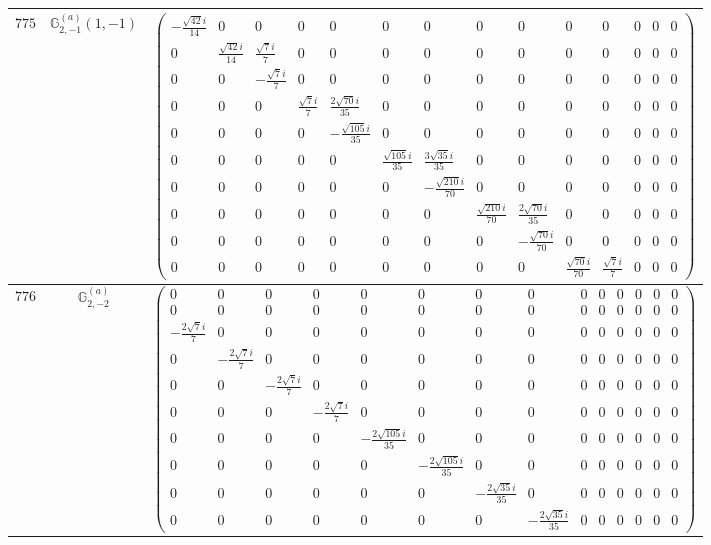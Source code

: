 \documentclass[fleqn,8pt,landscape]{jsarticle}
\begin{document}
\begin{center}
\begin{longtable}{ccc}
$ 775 $ & $ \mathbb{G}_{2,-1}^{(a)}(1,-1) $ & $ \begin{pmatrix} - \frac{\sqrt{42} i}{14} & 0 & 0 & 0 & 0 & 0 & 0 & 0 & 0 & 0 & 0 & 0 & 0 & 0 \\ 0 & \frac{\sqrt{42} i}{14} & \frac{\sqrt{7} i}{7} & 0 & 0 & 0 & 0 & 0 & 0 & 0 & 0 & 0 & 0 & 0 \\ 0 & 0 & - \frac{\sqrt{7} i}{7} & 0 & 0 & 0 & 0 & 0 & 0 & 0 & 0 & 0 & 0 & 0 \\ 0 & 0 & 0 & \frac{\sqrt{7} i}{7} & \frac{2 \sqrt{70} i}{35} & 0 & 0 & 0 & 0 & 0 & 0 & 0 & 0 & 0 \\ 0 & 0 & 0 & 0 & - \frac{\sqrt{105} i}{35} & 0 & 0 & 0 & 0 & 0 & 0 & 0 & 0 & 0 \\ 0 & 0 & 0 & 0 & 0 & \frac{\sqrt{105} i}{35} & \frac{3 \sqrt{35} i}{35} & 0 & 0 & 0 & 0 & 0 & 0 & 0 \\ 0 & 0 & 0 & 0 & 0 & 0 & - \frac{\sqrt{210} i}{70} & 0 & 0 & 0 & 0 & 0 & 0 & 0 \\ 0 & 0 & 0 & 0 & 0 & 0 & 0 & \frac{\sqrt{210} i}{70} & \frac{2 \sqrt{70} i}{35} & 0 & 0 & 0 & 0 & 0 \\ 0 & 0 & 0 & 0 & 0 & 0 & 0 & 0 & - \frac{\sqrt{70} i}{70} & 0 & 0 & 0 & 0 & 0 \\ 0 & 0 & 0 & 0 & 0 & 0 & 0 & 0 & 0 & \frac{\sqrt{70} i}{70} & \frac{\sqrt{7} i}{7} & 0 & 0 & 0 \end{pmatrix} $ \\ \hline
$ 776 $ & $ \mathbb{G}_{2,-2}^{(a)} $ & $ \begin{pmatrix} 0 & 0 & 0 & 0 & 0 & 0 & 0 & 0 & 0 & 0 & 0 & 0 & 0 & 0 \\ 0 & 0 & 0 & 0 & 0 & 0 & 0 & 0 & 0 & 0 & 0 & 0 & 0 & 0 \\ - \frac{2 \sqrt{7} i}{7} & 0 & 0 & 0 & 0 & 0 & 0 & 0 & 0 & 0 & 0 & 0 & 0 & 0 \\ 0 & - \frac{2 \sqrt{7} i}{7} & 0 & 0 & 0 & 0 & 0 & 0 & 0 & 0 & 0 & 0 & 0 & 0 \\ 0 & 0 & - \frac{2 \sqrt{7} i}{7} & 0 & 0 & 0 & 0 & 0 & 0 & 0 & 0 & 0 & 0 & 0 \\ 0 & 0 & 0 & - \frac{2 \sqrt{7} i}{7} & 0 & 0 & 0 & 0 & 0 & 0 & 0 & 0 & 0 & 0 \\ 0 & 0 & 0 & 0 & - \frac{2 \sqrt{105} i}{35} & 0 & 0 & 0 & 0 & 0 & 0 & 0 & 0 & 0 \\ 0 & 0 & 0 & 0 & 0 & - \frac{2 \sqrt{105} i}{35} & 0 & 0 & 0 & 0 & 0 & 0 & 0 & 0 \\ 0 & 0 & 0 & 0 & 0 & 0 & - \frac{2 \sqrt{35} i}{35} & 0 & 0 & 0 & 0 & 0 & 0 & 0 \\ 0 & 0 & 0 & 0 & 0 & 0 & 0 & - \frac{2 \sqrt{35} i}{35} & 0 & 0 & 0 & 0 & 0 & 0 \end{pmatrix} $ \\ \hline

\end{longtable}
\end{center}
\end{document}
